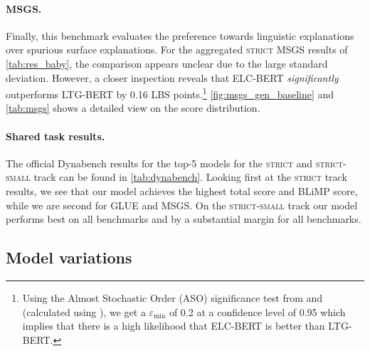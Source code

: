 \paragraph{MSGS.} 

Finally, this benchmark evaluates the preference towards linguistic explanations over spurious surface explanations. 
For the aggregated \textsc{strict} MSGS results of \cref{tab:res_baby}, the comparison appears unclear due to the large standard deviation. However, a closer inspection reveals that ELC-BERT \textit{significantly} outperforms LTG-BERT by 0.16 LBS points.\footnote{Using the Almost Stochastic Order (ASO) significance test from \citet{dror-etal-2019-deep} and \citet{del2018optimal} (calculated using \citet{ulmer2022deep}), we get a $\varepsilon_{\min}$ of 0.2 at a confidence level of 0.95 which implies that there is a high likelihood that ELC-BERT is better than LTG-BERT.} \cref{fig:msgs_gen_baseline} and \cref{tab:msgs} shows a detailed view on the score distribution. %

\paragraph{Shared task results.}

The official Dynabench results for the top-5 models for the \textsc{strict} and \textsc{strict-small} track can be found in \cref{tab:dynabench}. Looking first at the \textsc{strict} track results, we see that our model achieves the highest total score and BLiMP score, while we are second for GLUE and MSGS. On the \textsc{strict-small} track our model performs best on all benchmarks and by a substantial margin for all benchmarks. 

\subsection{Model variations}

